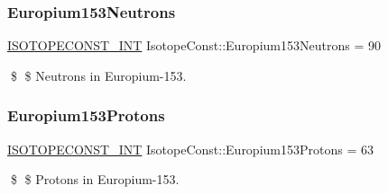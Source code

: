 \subsubsection{\texorpdfstring{Europium153\+Neutrons}{Europium153Neutrons}}
{\footnotesize\ttfamily \mbox{\hyperlink{group___isotope_const-_macros_ga5f18360b3e99483a35c32d789e62621c}{I\+S\+O\+T\+O\+P\+E\+C\+O\+N\+S\+T\+\_\+\+I\+NT}} Isotope\+Const\+::\+Europium153\+Neutrons = 90}

\$ \$ Neutrons in Europium-\/153. \mbox{\label{group___isotope_const-_europium-_eu153_gaa0b7fd86c3a70caeea8f8a64313a5225}} 
\subsubsection{\texorpdfstring{Europium153\+Protons}{Europium153Protons}}
{\footnotesize\ttfamily \mbox{\hyperlink{group___isotope_const-_macros_ga5f18360b3e99483a35c32d789e62621c}{I\+S\+O\+T\+O\+P\+E\+C\+O\+N\+S\+T\+\_\+\+I\+NT}} Isotope\+Const\+::\+Europium153\+Protons = 63}

\$ \$ Protons in Europium-\/153. 
